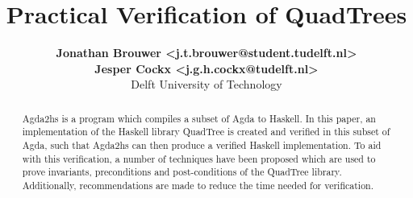 \documentclass[english]{article}
\begin{document}
\title{\textbf{Practical Verification of QuadTrees}}
\author{
	\textbf{Jonathan Brouwer <j.t.brouwer@student.tudelft.nl>} \\ 
	\textbf{Jesper Cockx <j.g.h.cockx@tudelft.nl>} \\ 
	Delft University of Technology
}
\maketitle

\begin{abstract}
Agda2hs is a program which compiles a subset of Agda to Haskell. In this paper, an implementation of the Haskell library QuadTree is created and verified in this subset of Agda, such that Agda2hs can then produce a verified Haskell implementation. To aid with this verification, a number of techniques have been proposed which are used to prove invariants, preconditions and post-conditions of the QuadTree library. Additionally, recommendations are made to reduce the time needed for verification.
\end{abstract}









\end{document}
